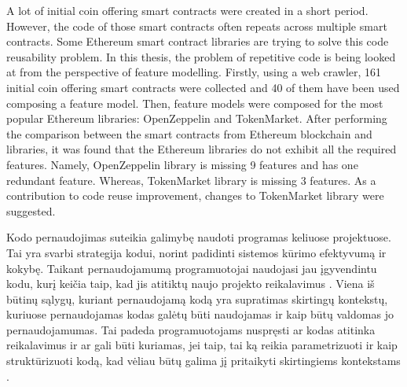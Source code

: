 \documentclass{VUMIFPSbakalaurinis}
\begin{document}


A lot of initial coin offering smart contracts were created in a short period. However, the code of those smart contracts often repeats across multiple smart contracts. Some Ethereum smart contract libraries are trying to solve this code reusability problem. In this thesis, the problem of repetitive code is being looked at from the perspective of feature modelling. Firstly, using a web crawler, 161 initial coin offering smart contracts were collected and 40 of them have been used composing a feature model. Then, feature models were composed for the most popular Ethereum libraries: OpenZeppelin and TokenMarket. After performing the comparison between the smart contracts from Ethereum blockchain and libraries, it was found that the Ethereum libraries do not exhibit all the required features. Namely, OpenZeppelin library is missing 9 features and has one redundant feature. Whereas, TokenMarket library is missing 3 features. As a contribution to code reuse improvement, changes to TokenMarket library were suggested.



\tableofcontents




Kodo pernaudojimas suteikia galimybę naudoti programas keliuose projektuose. Tai yra svarbi strategija kodui, norint padidinti sistemos kūrimo efektyvumą ir kokybę. Taikant pernaudojamumą programuotojai naudojasi jau įgyvendintu kodu, kurį keičia taip, kad jis atitiktų naujo projekto reikalavimus \cite {Ravichandran2003}. Viena iš būtinų sąlygų, kuriant pernaudojamą kodą yra supratimas skirtingų kontekstų, kuriuose pernaudojamas kodas galėtų būti naudojamas ir kaip būtų valdomas jo pernaudojamumas. Tai padeda programuotojams nuspręsti ar kodas atitinka reikalavimus ir ar gali būti kuriamas, jei taip, tai ką reikia parametrizuoti ir kaip struktūrizuoti kodą, kad vėliau būtų galima jį pritaikyti skirtingiems kontekstams \cite{Kang1990}.
\end{document}
